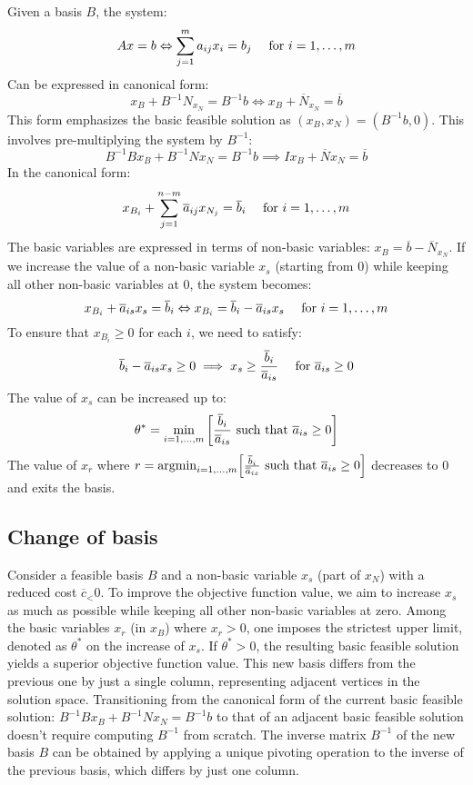 Given a basis $B$, the system:
\[Ax=b \Leftrightarrow \sum_{j=1}^{m}a_{ij}x_i=b_j \:\:\:\:\:\: \textnormal{for }i=1,\dots,m\]
Can be expressed in canonical form: 
\[x_B+B^{-1}N_{x_N}=B^{-1}b \Leftrightarrow x_B+\overline{N}_{x_N}=\overline{b}\]
This form emphasizes the basic feasible solution as $(x_B,x_N)=(B^{-1}b,0)$. 
This involves pre-multiplying the system by $B^{-1}$: 
\[B^{-1}Bx_B+B^{-1}Nx_N=B^{-1}b \implies Ix_B+\overline{N}x_N=\overline{b}\]
In the canonical form: 
\[x_{B_i}+\sum_{j=1}^{n-m}\overline{a}_{ij}x_{N_j}=\overline{b}_i \:\:\:\:\:\: \textnormal{for }i=1,\dots,m\]
The basic variables are expressed in terms of non-basic variables: $x_B=\overline{b}-\overline{N}_{x_N}$. 
If we increase the value of a non-basic variable $x_s$ (starting from 0) while keeping all other non-basic variables at 0, the system becomes: 
\[x_{B_i}+\overline{a}_{is}x_s=\overline{b}_i \Leftrightarrow x_{B_i}=\overline{b}_i-\overline{a}_{is}x_s \:\:\:\:\:\: \textnormal{for }i=1,\dots,m\]
To ensure that $x_{B_i} \geq 0$ for each $i$, we need to satisfy: 
\[\overline{b}_i-\overline{a}_{is}x_s \geq 0 \implies x_s \geq \dfrac{\overline{b}_i}{\overline{a}_{is}} \:\:\:\:\:\: \textnormal{for }\overline{a}_{is} \geq 0\]
The value of $x_s$ can be increased up to: 
\[\theta^{*}=\min_{i=1,\dots,m}{\left[\dfrac{\overline{b}_i}{\overline{a}_{is}} \textnormal{ such that }\overline{a}_{is} \geq 0\right]}\]
The value of $x_r$ where $r=\textnormal{argmin}_{i=1,\dots,m}{\left[\frac{\overline{b}_i}{\overline{a}_{is}} \textnormal{ such that }\overline{a}_{is} \geq 0\right]}$ decreases to 0 and exits the basis. 

\subsection{Change of basis}
Consider a feasible basis $B$ and a non-basic variable $x_s$ (part of $x_N$) with a reduced cost $\overline{c}_ < 0$.
To improve the objective function value, we aim to increase $x_s$ as much as possible while keeping all other non-basic variables at zero.
Among the basic variables $x_r$ (in $x_B$) where $x_r>0$, one imposes the strictest upper limit, denoted as $\theta^{*}$ on the increase of $x_s$.
If $\theta^{*} > 0$, the resulting basic feasible solution yields a superior objective function value.
This new basis differs from the previous one by just a single column, representing adjacent vertices in the solution space.
Transitioning from the canonical form of the current basic feasible solution:
$B^{-1}Bx_B+B^{-1}Nx_N=B^{-1}b$
to that of an adjacent basic feasible solution doesn't require computing $B^{-1}$ from scratch.
The inverse matrix $B^{-1}$ of the new basis $B$ can be obtained by applying a unique pivoting operation to the inverse of the previous basis, which differs by just one column.

